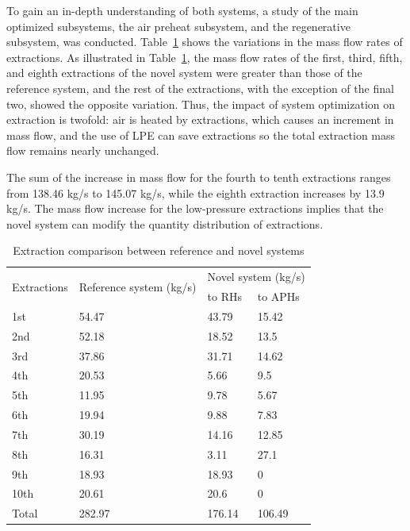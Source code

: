 \documentclass[preprint,12pt]{elsarticle}
\begin{document}

To gain an in-depth understanding of both systems, a study of the main optimized subsystems, the air preheat subsystem, and the regenerative subsystem, was conducted.
Table~\ref{table:extraction_compare} shows the variations in the mass flow rates of extractions.
As illustrated in Table~\ref{table:extraction_compare}, the mass flow rates of the first, third, fifth, and eighth extractions of the novel system were greater than those of the reference system, and the rest of the extractions, with the exception of the final two, showed the opposite variation.
Thus, the impact of system optimization on extraction is twofold: air is heated by extractions, which causes an increment in mass flow, and the use of LPE can save extractions so the total extraction mass flow remains nearly unchanged. %

The sum of the increase in mass flow for the fourth to tenth extractions ranges from 138.46 kg/s to 145.07 kg/s, while the eighth extraction increases by 13.9 kg/s.
The mass flow increase for the low-pressure extractions implies that the novel system can modify the quantity distribution of extractions.

\begin{table}
\caption{Extraction comparison between reference and novel systems}
\label{table:extraction_compare}
\begin{centering}
\begin{tabular}{llll}
\toprule 
\multirow{2}{*}{Extractions} & \multirow{2}{2.5cm}{Reference system (kg/s)} & \multicolumn{2}{c}{Novel system (kg/s)}\tabularnewline
\cmidrule{3-4} 
 &  & to RHs & to APHs\tabularnewline
\midrule
1st & 54.47 & 43.79 & 15.42\tabularnewline
2nd & 52.18 & 18.52 & 13.5\tabularnewline
3rd & 37.86 & 31.71 & 14.62\tabularnewline
4th & 20.53 & 5.66 & 9.5\tabularnewline
5th & 11.95 & 9.78 & 5.67\tabularnewline
6th & 19.94 & 9.88 & 7.83\tabularnewline
7th & 30.19 & 14.16 & 12.85\tabularnewline
8th & 16.31 & 3.11 & 27.1\tabularnewline
9th & 18.93 & 18.93 & 0\tabularnewline
10th & 20.61 & 20.6 & 0\tabularnewline
Total & 282.97 & 176.14 & 106.49\tabularnewline
\bottomrule
\end{tabular}
\par\end{centering}
\end{table}
\end{document}
